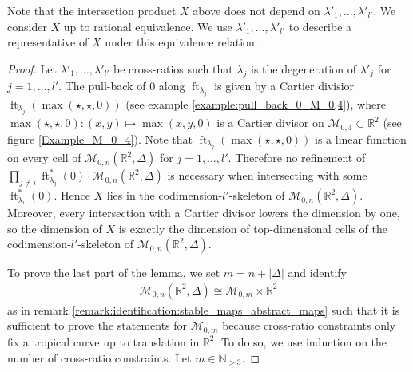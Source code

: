 \documentclass[11pt,reqno,a4]{amsart}
\theoremstyle{dotless}
\theoremstyle{definition}
\newcommand{\ft}{\operatorname{ft}}
\begin{document}
Note that the intersection product $X$ above does not depend on $\lambda'_1,\dots,\lambda'_{l'}$. We consider $X$ up to rational equivalence. We use $\lambda'_1,\dots,\lambda'_{l'}$ to describe a representative of $X$ under this equivalence relation.
\begin{proof}
Let $\lambda'_1,\dots,\lambda'_{l'}$ be cross-ratios such that $\lambda_j$ is the degeneration of $\lambda'_j$ for $j=1,\dots,l'$. The pull-back of $0$ along $\ft_{\lambda_j}$ is given by a Cartier divisior $\ft_{\lambda_j}\left(\max(\star,\star,0)\right)$ (see  example \ref{example:pull_back_0_M_0,4}), where $\max(\star,\star,0):\left(x,y\right)\mapsto\max(x,y,0)$ is a Cartier divisor on $\mathcal{M}_{0,4}\subset \mathbb{R}^2$ (see figure \ref{Example_M_0_4}). Note that $\ft_{\lambda_j}\left(\max(\star,\star,0)\right)$ is a linear function on every cell of $\mathcal{M}_{0,n}\left(\mathbb{R}^2,\Delta \right)$ for $j=1,\dots,l'$. Therefore no refinement of $\prod_{j\neq i}\ft_{\lambda_j}^*\left( 0\right)\cdot\mathcal{M}_{0,n}\left(\mathbb{R}^2,\Delta \right)$ is necessary when intersecting with some $\ft_{\lambda_i}^*\left( 0\right)$. Hence $X$ lies in the codimension-$l'$-skeleton of $\mathcal{M}_{0,n}\left(\mathbb{R}^2,\Delta \right)$. Moreover, every intersection with a Cartier divisor lowers the dimension by one, so the dimension of $X$ is exactly the dimension of top-dimensional cells of the codimension-$l'$-skeleton of $\mathcal{M}_{0,n}\left(\mathbb{R}^2,\Delta \right)$.

To prove the last part of the lemma, we set $m=n+|\Delta|$ and identify
\begin{align*}
\mathcal{M}_{0,n}\left(\mathbb{R}^2,\Delta \right)\cong\mathcal{M}_{0,m}\times\mathbb{R}^2
\end{align*}
as in remark \ref{remark:identification:stable_maps_abstract_maps} such that it is sufficient to prove the statements for $\mathcal{M}_{0,m}$ because cross-ratio constraints only fix a tropical curve up to translation in $\mathbb{R}^2$. To do so, we use induction on the number of cross-ratio constraints. Let $m\in\mathbb{N}_{>3}$.


\end{proof}
\end{document}
